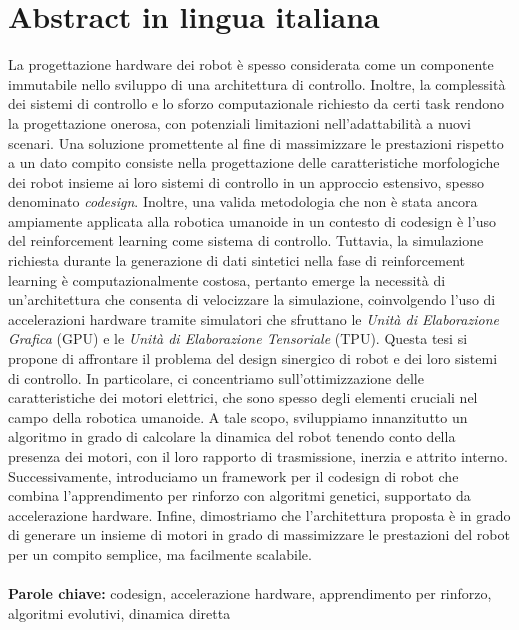 \documentclass{Configuration_Files/PoliMi3i_thesis}
\begin{document}
\chapter*{Abstract in lingua italiana}
La progettazione hardware dei robot è spesso considerata come un componente immutabile nello sviluppo di una architettura di controllo. Inoltre, la complessità dei sistemi di controllo e lo sforzo computazionale richiesto da certi task rendono la progettazione onerosa, con potenziali limitazioni nell'adattabilità a nuovi scenari. Una soluzione promettente al fine di massimizzare le prestazioni rispetto a un dato compito consiste nella progettazione delle caratteristiche morfologiche dei robot insieme ai loro sistemi di controllo in un approccio estensivo, spesso denominato \textit{codesign}. Inoltre, una valida metodologia che non è stata ancora ampiamente applicata alla robotica umanoide in un contesto di codesign è l'uso del reinforcement learning come sistema di controllo. Tuttavia, la simulazione richiesta durante la generazione di dati sintetici nella fase di reinforcement learning è computazionalmente costosa, pertanto emerge la necessità di un'architettura che consenta di velocizzare la simulazione, coinvolgendo l'uso di accelerazioni hardware tramite simulatori che sfruttano le \textit{Unità di Elaborazione Grafica} (GPU) e le \textit{Unità di Elaborazione Tensoriale} (TPU).
Questa tesi si propone di affrontare il problema del design sinergico di robot e dei loro sistemi di controllo. In particolare, ci concentriamo sull'ottimizzazione delle caratteristiche dei motori elettrici, che sono spesso degli elementi cruciali nel campo della robotica umanoide. A tale scopo, sviluppiamo innanzitutto un algoritmo in grado di calcolare la dinamica del robot tenendo conto della presenza dei motori, con il loro rapporto di trasmissione, inerzia e attrito interno. Successivamente, introduciamo un framework per il codesign di robot che combina l'apprendimento per rinforzo con algoritmi genetici, supportato da accelerazione hardware. Infine, dimostriamo che l'architettura proposta è in grado di generare un insieme di motori in grado di massimizzare le prestazioni del robot per un compito semplice, ma facilmente scalabile.
\\
\\
\textbf{Parole chiave:} codesign, accelerazione hardware, apprendimento per rinforzo, algoritmi evolutivi, dinamica diretta %

\end{document}
